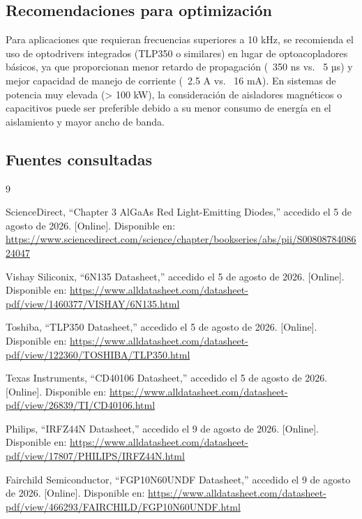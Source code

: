 \documentclass[12pt]{article}
\begin{document}
\subsection{Recomendaciones para optimización}

Para aplicaciones que requieran frecuencias superiores a 10 kHz, se recomienda el uso de optodrivers integrados (TLP350 o similares) en lugar de optoacopladores básicos, ya que proporcionan menor retardo de propagación (~350 ns vs. ~5 µs) y mejor capacidad de manejo de corriente (~2.5 A vs. ~16 mA). En sistemas de potencia muy elevada (> 100 kW), la consideración de aisladores magnéticos o capacitivos puede ser preferible debido a su menor consumo de energía en el aislamiento y mayor ancho de banda.

\subsection{Fuentes consultadas}
\begin{thebibliography}{9}

ScienceDirect, ``Chapter 3 AlGaAs Red Light-Emitting Diodes,'' accedido el 5 de agosto de 2026. [Online]. Disponible en: \url{https://www.sciencedirect.com/science/chapter/bookseries/abs/pii/S0080878408624047}

Vishay Siliconix, ``6N135 Datasheet,'' accedido el 5 de agosto de 2026. [Online]. Disponible en: \url{https://www.alldatasheet.com/datasheet-pdf/view/1460377/VISHAY/6N135.html}

Toshiba, ``TLP350 Datasheet,'' accedido el 5 de agosto de 2026. [Online]. Disponible en: \url{https://www.alldatasheet.com/datasheet-pdf/view/122360/TOSHIBA/TLP350.html}

Texas Instruments, ``CD40106 Datasheet,'' accedido el 5 de agosto de 2026. [Online]. Disponible en: \url{https://www.alldatasheet.com/datasheet-pdf/view/26839/TI/CD40106.html}

Philips, ``IRFZ44N Datasheet,'' accedido el 9 de agosto de 2026. [Online]. Disponible en: \url{https://www.alldatasheet.com/datasheet-pdf/view/17807/PHILIPS/IRFZ44N.html}

Fairchild Semiconductor, ``FGP10N60UNDF Datasheet,'' accedido el 9 de agosto de 2026. [Online]. Disponible en: \url{https://www.alldatasheet.com/datasheet-pdf/view/466293/FAIRCHILD/FGP10N60UNDF.html}

\end{thebibliography}



\end{document}
